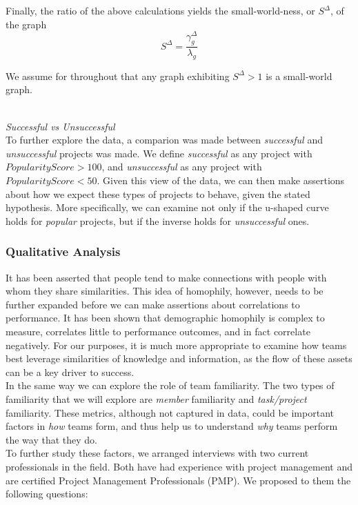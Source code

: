 \documentclass{proc}
\begin{document}
Finally, the ratio of the above calculations yields the small-world-ness, or $S^\Delta$, of the graph
\[S^\Delta = \frac{\gamma^{\Delta}_g }{\lambda_g} \]

We assume for throughout that any graph exhibiting $S^\Delta > 1$ is a small-world graph.

\noindent\\\textit{Successful vs Unsuccessful}\\
To further explore the data, a comparion was made between \textit{successful} and \textit{unsuccessful} projects was made. We define \textit{successful} as any project with {$PopularityScore > 100$}, and \textit{unsuccessful} as any project with {$PopularityScore < 50$}. Given this view of the data, we can then make assertions about how we expect these types of projects to behave, given the stated hypothesis. More specifically, we can examine not only if the u-shaped curve holds for \textit{popular} projects, but if the inverse holds for \textit{unsuccessful} ones.


\subsubsection{Qualitative Analysis}
It has been asserted that people tend to make connections with people with whom they share similarities\cite{mcpherson2001birds}. This idea of homophily, however, needs to be further expanded before we can make assertions about correlations to performance. It has been shown that demographic homophily is complex to measure, correlates little to performance outcomes, and in fact correlate negatively\cite{reagans2004make,lawrence1997perspective}. For our purposes, it is much more appropriate to examine how teams best leverage similarities of knowledge and information, as the flow of these assets can be a key driver to success\cite{nissen2002extended}.\\
In the same way we can explore the role of team familiarity. The two types of familiarity that we will explore are \textit{member} familiarity and \textit{task/project} familiarity\cite{harrison2003time}. These metrics, although not captured in data, could be important factors in \textit{how} teams form, and thus help us to understand \textit{why} teams perform the way that they do.\\

To further study these factors, we arranged interviews with two current professionals in the field. Both have had experience with project management and are certified Project Management Professionals (PMP)\textregistered. We proposed to them the following questions:
\end{document}
